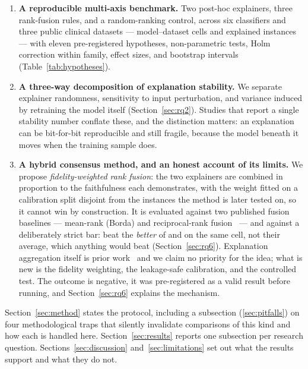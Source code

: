 \begin{enumerate}
  \item \textbf{A reproducible multi-axis benchmark.} Two post-hoc explainers, three
    rank-fusion rules, and a random-ranking control, across six classifiers and three
    public clinical datasets --- \NumCells{} model--dataset cells and \NumExplained{}
    explained instances --- with eleven pre-registered hypotheses, non-parametric
    tests, Holm correction within family, effect sizes, and bootstrap intervals
    (Table~\ref{tab:hypotheses}).
  \item \textbf{A three-way decomposition of explanation stability.} We separate
    explainer randomness, sensitivity to input perturbation, and variance induced by
    retraining the model itself (Section~\ref{sec:rq2}). Studies that report a single
    stability number conflate these, and the distinction matters: an explanation can
    be bit-for-bit reproducible and still fragile, because the model beneath it moves
    when the training sample does.
  \item \textbf{A hybrid consensus method, and an honest account of its limits.} We
    propose \emph{fidelity-weighted rank fusion}: the two explainers are combined in
    proportion to the faithfulness each demonstrates, with the weight fitted on a
    calibration split disjoint from the instances the method is later tested on, so it
    cannot win by construction. It is evaluated against two published fusion baselines
    --- mean-rank (Borda) and reciprocal-rank fusion~\cite{cormack2009reciprocal} ---
    and against a deliberately strict bar: beat the \emph{better} of \shap{} and
    \lime{} on the same cell, not their average, which anything would beat
    (Section~\ref{sec:rq6}). Explanation aggregation itself is prior
    work~\cite{bhatt2020aggregating,rieger2020simple} and we claim no priority for the
    idea; what is new is the fidelity weighting, the leakage-safe calibration, and the
    controlled test. The outcome is negative, it was pre-registered as a valid result
    before running, and Section~\ref{sec:rq6} explains the mechanism.
\end{enumerate}

Section~\ref{sec:method} states the protocol, including a subsection
(\ref{sec:pitfalls}) on four methodological traps that silently invalidate
comparisons of this kind and how each is handled here. Section~\ref{sec:results}
reports one subsection per research question. Sections~\ref{sec:discussion}
and~\ref{sec:limitations} set out what the results support and what they do not.

